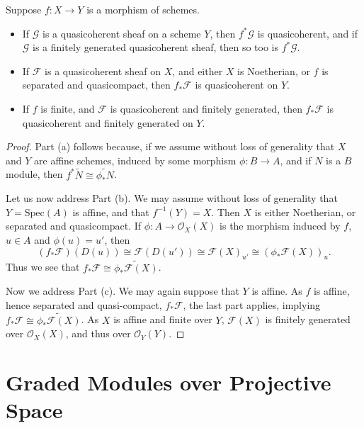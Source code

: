 \begin{theorem}
    Suppose $f: X \to Y$ is a morphism of schemes.
    \begin{itemize}
        \item If $\mathcal{G}$ is a quasicoherent sheaf on a scheme $Y$, then $f^* \mathcal{G}$ is quasicoherent, and if $\mathcal{G}$ is a finitely generated quasicoherent sheaf, then so too is $f^* \mathcal{G}$.
        \item If $\mathcal{F}$ is a quasicoherent sheaf on $X$, and either $X$ is Noetherian, or $f$ is separated and quasicompact, then $f_* \mathcal{F}$ is quasicoherent on $Y$.
        \item If $f$ is finite, and $\mathcal{F}$ is quasicoherent and finitely generated, then $f_* \mathcal{F}$ is quasicoherent and finitely generated on $Y$.
    \end{itemize}
\end{theorem}
\begin{proof}
    Part (a) follows because, if we assume without loss of generality that $X$ and $Y$ are affine schemes, induced by some morphism $\phi: B \to A$, and if $N$ is a $B$ module, then $f^* \widetilde{N} \cong \widetilde{\phi_* N}$.

    Let us now address Part (b). We may assume without loss of generality that $Y = \text{Spec}(A)$ is affine, and that $f^{-1}(Y) = X$. Then $X$ is either Noetherian, or separated and quasicompact. If $\phi: A \to \mathcal{O}_X(X)$ is the morphism induced by $f$, $u \in A$ and $\phi(u) = u'$, then
    \[ (f_* \mathcal{F})(D(u)) \cong \mathcal{F}(D(u')) \cong \mathcal{F}(X)_{u'} \cong ( \phi_* \mathcal{F}(X) )_u. \]
    Thus we see that $f_* \mathcal{F} \cong \widetilde{\phi_* \mathcal{F}(X)}$.

    Now we address Part (c). We may again suppose that $Y$ is affine. As $f$ is affine, hence separated and quasi-compact, $f_* \mathcal{F}$, the last part applies, implying $f_* \mathcal{F} \cong \widetilde{\phi_* \mathcal{F}(X)}$. As $X$ is affine and finite over $Y$, $\mathcal{F}(X)$ is finitely generated over $\mathcal{O}_X(X)$, and thus over $\mathcal{O}_Y(Y)$.
\end{proof}

\section{Graded Modules over Projective Space}

